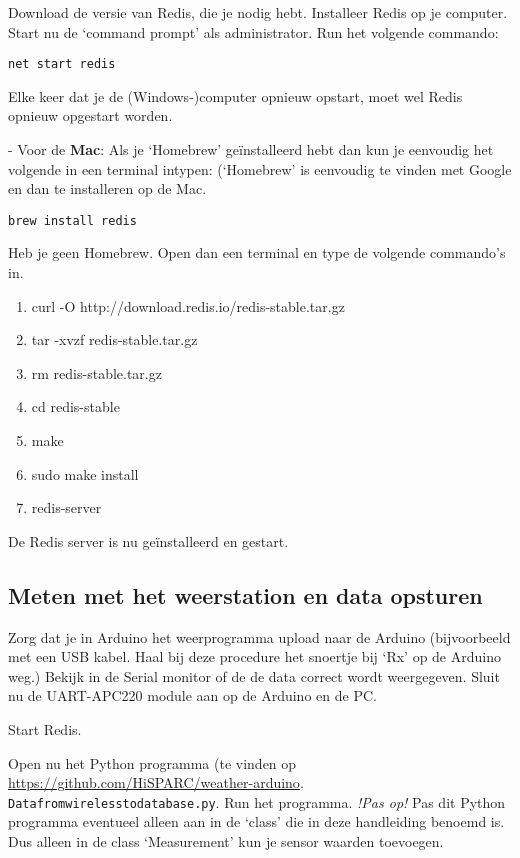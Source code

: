 Download de versie van Redis, die je nodig hebt.
Installeer Redis op je computer. Start nu de `command prompt' als administrator.
Run het volgende commando:

\begin{verbatim}
net start redis
\end{verbatim}

Elke keer dat je de (Windows-)computer opnieuw opstart, moet wel Redis opnieuw
opgestart worden.

- Voor de \textbf{Mac}:
Als je `Homebrew' geïnstalleerd hebt dan kun je eenvoudig het volgende
in een terminal intypen: (`Homebrew' is eenvoudig te vinden met Google
en dan te installeren op de Mac.

\begin{verbatim}
brew install redis
\end{verbatim}

Heb je geen Homebrew. Open dan een terminal en type de volgende commando's in.

\begin{enumerate}
    \item curl -O http://download.redis.io/redis-stable.tar.gz
    \item tar -xvzf redis-stable.tar.gz
    \item rm redis-stable.tar.gz
    \item cd redis-stable
    \item make
    \item sudo make install
    \item redis-server
\end{enumerate}

De Redis server is nu geïnstalleerd en gestart.


\subsection{Meten met het weerstation en data opsturen}

Zorg dat je in Arduino het weerprogramma upload naar de Arduino
(bijvoorbeeld met een USB kabel. Haal bij deze procedure het snoertje bij `Rx' op de
Arduino weg.) Bekijk in de Serial monitor of de de data correct wordt
weergegeven. Sluit nu de UART-APC220 module aan op de Arduino en de PC.

Start Redis.

Open nu het Python programma (te vinden op
\url{https://github.com/HiSPARC/weather-arduino}. \verb|Datafromwirelesstodatabase.py|.
Run het programma.
\emph{!Pas op!} Pas dit Python programma eventueel alleen aan in de `class' die in deze
handleiding benoemd is. Dus alleen in de class `Measurement' kun je sensor waarden
toevoegen.

